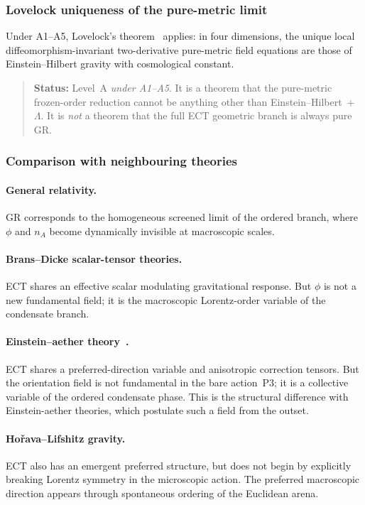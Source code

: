 \subsubsection*{Lovelock uniqueness of the pure-metric limit}

Under A1--A5, Lovelock's theorem~\cite{Lovelock1971} applies:
in four dimensions, the unique local diffeomorphism-invariant
two-derivative pure-metric field equations are those of
Einstein--Hilbert gravity with cosmological constant.
\begin{quote}
  \textbf{Status:} Level~A \emph{under A1--A5}.
  It is a theorem that the pure-metric frozen-order reduction cannot be
  anything other than Einstein--Hilbert~+~$\Lambda$.
  It is \emph{not} a theorem that the full ECT geometric branch is
  always pure GR.
\end{quote}

\subsubsection*{Comparison with neighbouring theories}

\paragraph{General relativity.}
GR corresponds to the homogeneous screened limit of the ordered branch,
where $\phi$ and $n_A$ become dynamically invisible at macroscopic scales.

\paragraph{Brans--Dicke scalar-tensor theories.}
ECT shares an effective scalar modulating gravitational response.
But $\phi$ is not a new fundamental field; it is the macroscopic
Lorentz-order variable of the condensate branch.

\paragraph{Einstein--aether theory~\cite{Jacobson2004}.}
ECT shares a preferred-direction variable and anisotropic correction
tensors.
But the orientation field is not fundamental in the bare action~P3;
it is a collective variable of the ordered condensate phase.
This is the structural difference with Einstein-aether theories, which
postulate such a field from the outset.

\paragraph{Ho\v{r}ava--Lifshitz gravity.}
ECT also has an emergent preferred structure, but does not begin by
explicitly breaking Lorentz symmetry in the microscopic action.
The preferred macroscopic direction appears through spontaneous ordering
of the Euclidean arena.

